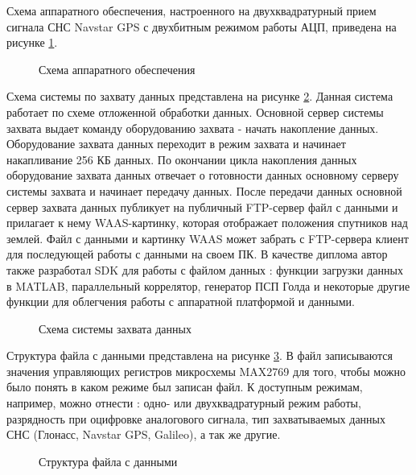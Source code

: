 Схема аппаратного обеспечения, настроенного на двухквадратурный прием сигнала СНС Navstar GPS с двухбитным режимом работы АЦП, приведена на рисунке \ref{pic:board_scheme}.
\begin{figure}[h]
	\center{}
	\caption{Схема аппаратного обеспечения}
	\label{pic:board_scheme}
\end{figure}

Схема системы по захвату данных представлена на рисунке \ref{pic:gps_acq_system_scheme}. Данная система работает по схеме отложенной обработки данных. Основной сервер системы захвата
выдает команду оборудованию захвата - начать накопление данных. Оборудование захвата данных переходит в режим захвата и начинает накапливание 256 КБ данных. По окончании цикла
накопления данных оборудование захвата данных отвечает о готовности данных основному серверу системы захвата и начинает передачу данных. После передачи данных основной сервер
захвата данных публикует на публичный FTP-сервер файл с данными и прилагает к нему WAAS-картинку, которая отображает положения спутников над землей. Файл с данными
и картинку WAAS может забрать с FTP-сервера клиент для последующей работы с данными на своем ПК. В качестве диплома автор также разработал SDK для работы с файлом данных
\cite{github-gpsproject}: функции загрузки данных в MATLAB, параллельный коррелятор, генератор ПСП Голда и некоторые другие функции для облегчения работы с аппаратной платформой
и данными.

\begin{figure}[h]
	\center{}
	\caption{Схема системы захвата данных}
	\label{pic:gps_acq_system_scheme}
\end{figure}

Структура файла с данными представлена на рисунке \ref{pic:dump_file}. В файл записываются значения управляющих регистров микросхемы MAX2769 для того, чтобы можно было
понять в каком режиме был записан файл. К доступным режимам, например, можно отнести \cite{max2769_manual}: одно- или двухквадратурный режим работы, разрядность при оцифровке
аналогового сигнала, тип захватываемых данных СНС (Глонасс, Navstar GPS, Galileo), а так же другие.
\begin{figure}[h]
	\center{}
	\caption{Структура файла с данными}
	\label{pic:dump_file}
\end{figure}

